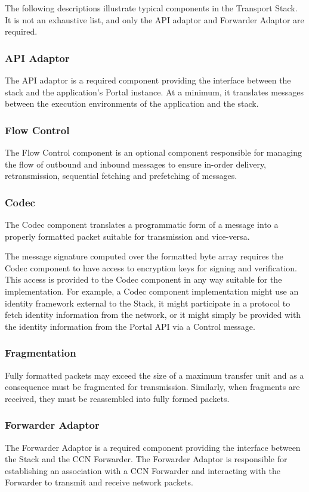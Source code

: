 The following descriptions illustrate typical components in the Transport Stack. 
It is not an exhaustive list, and only the API adaptor and Forwarder Adaptor are required. 

\subsubsection{API Adaptor}
The API adaptor is a required component providing the interface
between the stack and the application's Portal instance.
At a minimum, it translates messages between the execution environments of the application and the stack.

\subsubsection{Flow Control}
The Flow Control component is an optional component
responsible for managing the flow of outbound and inbound messages to
ensure in-order delivery, retransmission, sequential fetching and prefetching of messages.

\subsubsection{Codec}
The Codec component translates a programmatic form of a message into a properly formatted packet suitable for transmission and vice-versa.

The message signature computed over the formatted byte array requires the Codec component to have access to encryption keys for signing and verification.
This access is provided to the Codec component in any way suitable for the implementation.
For example, a Codec component implementation might use an identity framework external to the Stack,
it might participate in a protocol to fetch identity information from the network,
or it might simply be provided with the identity information from the Portal API via a Control message.

\subsubsection{Fragmentation}
Fully formatted packets may exceed the size of a maximum transfer unit and as a consequence
must be fragmented for transmission.
Similarly, when fragments are received, they must be reassembled into fully formed packets.

\subsubsection{Forwarder Adaptor}
The Forwarder Adaptor is a required component providing the interface between the Stack and the CCN Forwarder.
The Forwarder Adaptor is responsible for establishing an association with a CCN Forwarder
and interacting with the Forwarder to transmit and receive network packets.

